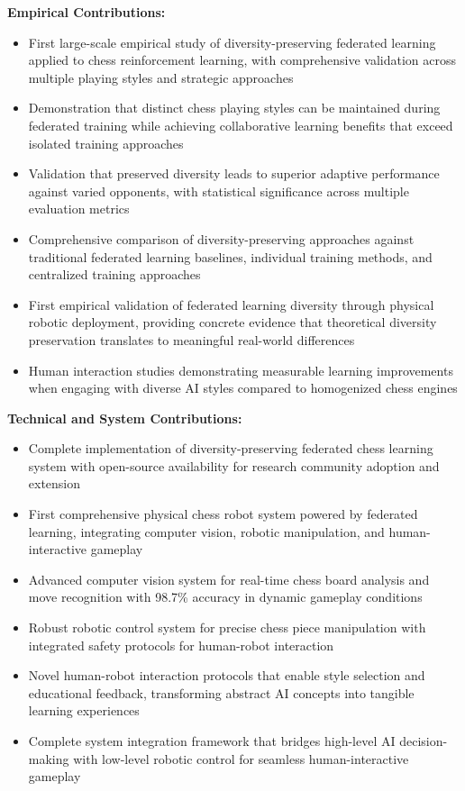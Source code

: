 \textbf{Empirical Contributions:}
\begin{itemize}
\item First large-scale empirical study of diversity-preserving federated learning applied to chess reinforcement learning, with comprehensive validation across multiple playing styles and strategic approaches
\item Demonstration that distinct chess playing styles can be maintained during federated training while achieving collaborative learning benefits that exceed isolated training approaches
\item Validation that preserved diversity leads to superior adaptive performance against varied opponents, with statistical significance across multiple evaluation metrics
\item Comprehensive comparison of diversity-preserving approaches against traditional federated learning baselines, individual training methods, and centralized training approaches
\item First empirical validation of federated learning diversity through physical robotic deployment, providing concrete evidence that theoretical diversity preservation translates to meaningful real-world differences
\item Human interaction studies demonstrating measurable learning improvements when engaging with diverse AI styles compared to homogenized chess engines
\end{itemize}

\textbf{Technical and System Contributions:}
\begin{itemize}
\item Complete implementation of diversity-preserving federated chess learning system with open-source availability for research community adoption and extension
\item First comprehensive physical chess robot system powered by federated learning, integrating computer vision, robotic manipulation, and human-interactive gameplay
\item Advanced computer vision system for real-time chess board analysis and move recognition with 98.7\% accuracy in dynamic gameplay conditions
\item Robust robotic control system for precise chess piece manipulation with integrated safety protocols for human-robot interaction
\item Novel human-robot interaction protocols that enable style selection and educational feedback, transforming abstract AI concepts into tangible learning experiences
\item Complete system integration framework that bridges high-level AI decision-making with low-level robotic control for seamless human-interactive gameplay
\end{itemize}

